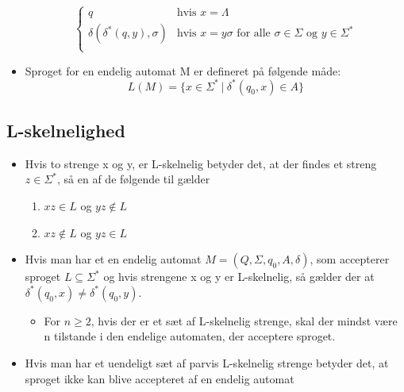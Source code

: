 \documentclass[a4, danish]{article}
\begin{document}
\begin{itemize}
\begin{equation*}
		\begin{cases}
			\mbox{$q$} & \mbox{hvis $x = \Lambda$} \\
			\mbox{$\delta(\delta^*(q,y),\sigma)$} & \mbox{hvis $x=y\sigma$ for alle $\sigma \in \Sigma$ og $y\in \Sigma^*$} \\
		\end{cases}
		\end{equation*}
    \item Sproget for en endelig automat M er defineret på følgende måde:
    \begin{equation*}
      L(M)=\{x \in \Sigma^* \ | \ \delta^*(q_0,x)\in A \}
    \end{equation*}
  \end{itemize}

\subsection{L-skelnelighed}
  \begin{itemize}
    \item Hvis to strenge x og y, er L-skelnelig betyder det, at der findes et streng $z \in \Sigma^*$, så en af de følgende til gælder
     \begin{enumerate}
       \item $xz \in L$ og $yz \notin L$
       \item $xz \notin L$ og $yz \in L$
     \end{enumerate}
    \item Hvis man har et en endelig automat $M=(Q,\Sigma,q_0,A,\delta)$, som accepterer sproget $L\subseteq\Sigma^*$ og hvis strengene x og y er L-skelnelig, så gælder der at $\delta^*(q_0,x) \neq \delta^*(q_0,y) $. 
    \begin{itemize}
      \item For $n \geq 2$, hvis der er et sæt af L-skelnelig strenge, skal der mindst være n tilstande i den endelige automaten, der acceptere sproget.
    \end{itemize}
    \item Hvis man har et uendeligt sæt af parvis L-skelnelig strenge betyder det, at sproget ikke kan blive accepteret af en endelig automat 
  \end{itemize}
\end{document}

